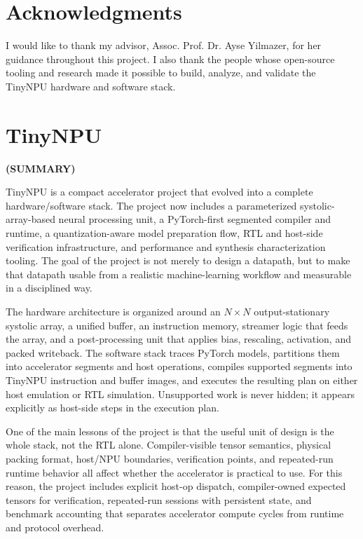 \documentclass[a4paper, 12pt, titlepage]{article}
\newcommand{\thetitle}{TinyNPU}
\begin{document}
\newpage
\section*{Acknowledgments}
I would like to thank my advisor, Assoc. Prof. Dr. Ayse Yilmazer, for her guidance throughout this project. I also thank the people whose open-source tooling and research made it possible to build, analyze, and validate the TinyNPU hardware and software stack.

\newpage
\section*{\centering\thetitle}
\centerline{\fontsize{16pt}{21.6pt}\sffamily\bfseries (SUMMARY)}
TinyNPU is a compact accelerator project that evolved into a complete hardware/software stack. The project now includes a parameterized systolic-array-based neural processing unit, a PyTorch-first segmented compiler and runtime, a quantization-aware model preparation flow, RTL and host-side verification infrastructure, and performance and synthesis characterization tooling. The goal of the project is not merely to design a datapath, but to make that datapath usable from a realistic machine-learning workflow and measurable in a disciplined way.

The hardware architecture is organized around an $N \times N$ output-stationary systolic array, a unified buffer, an instruction memory, streamer logic that feeds the array, and a post-processing unit that applies bias, rescaling, activation, and packed writeback. The software stack traces PyTorch models, partitions them into accelerator segments and host operations, compiles supported segments into TinyNPU instruction and buffer images, and executes the resulting plan on either host emulation or RTL simulation. Unsupported work is never hidden; it appears explicitly as host-side steps in the execution plan.

One of the main lessons of the project is that the useful unit of design is the whole stack, not the RTL alone. Compiler-visible tensor semantics, physical packing format, host/NPU boundaries, verification points, and repeated-run runtime behavior all affect whether the accelerator is practical to use. For this reason, the project includes explicit host-op dispatch, compiler-owned expected tensors for verification, repeated-run sessions with persistent state, and benchmark accounting that separates accelerator compute cycles from runtime and protocol overhead.
\end{document}

